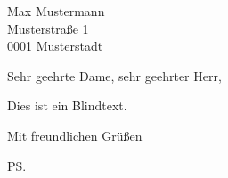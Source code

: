 \documentclass[]{scrlttr2}
\begin{document}
	
\pagestyle{empty}


\begin{letter}{ 
    Max Mustermann 	\\
    Musterstraße 1	\\
    0001 Musterstadt\\
}

\opening{Sehr geehrte Dame, sehr geehrter Herr,}

Dies ist ein Blindtext.

\closing{Mit freundlichen Grüßen}


\ps{}


\end{letter}
\end{document}
